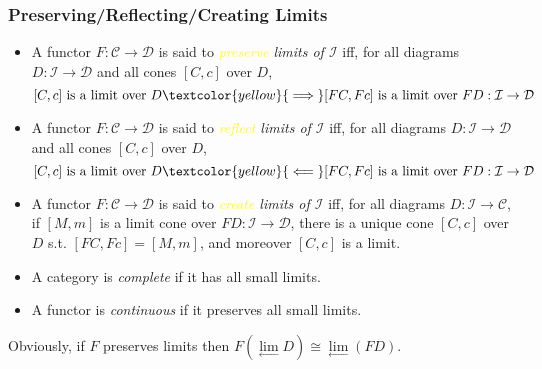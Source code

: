 \documentclass[UTF8,aspectratio=43,11pt,colorlinks,compress,openany]{beamer}%
\begin{document}
\begin{frame}\frametitle{Preserving/Reflecting/Creating Limits}
\begin{itemize}
	\item A functor $F:\mathcal{C}\to\mathcal{D}$ is said to \emph{\textcolor{yellow}{preserve} limits of $\mathcal{I}$} iff, for all diagrams $D:\mathcal{I}\to\mathcal{D}$ and all cones $[C,c]$ over $D$,
	\[[C,c] \mbox{ is a limit over } D\textcolor{yellow}{\implies} [FC,Fc] \mbox{ is a limit over } FD:\mathcal{I}\to\mathcal{D}\]
	\item A functor $F:\mathcal{C}\to\mathcal{D}$ is said to \emph{\textcolor{yellow}{reflect} limits of $\mathcal{I}$} iff, for all diagrams $D:\mathcal{I}\to\mathcal{D}$ and all cones $[C,c]$ over $D$,
	\[[C,c] \mbox{ is a limit over } D\textcolor{yellow}{\impliedby} [FC,Fc] \mbox{ is a limit over } FD:\mathcal{I}\to\mathcal{D}\]
	\item A functor $F:\mathcal{C}\to\mathcal{D}$ is said to \emph{\textcolor{yellow}{create} limits of $\mathcal{I}$} iff, for all diagrams $D:\mathcal{I}\to\mathcal{C}$, if $[M,m]$ is a limit cone over $FD:\mathcal{I}\to\mathcal{D}$, there is a unique cone $[C,c]$ over $D$ s.t. $[FC,Fc]=[M,m]$, and moreover $[C,c]$ is a limit.
	\item A category is \emph{complete} if it has all small limits.
	\item A functor is \emph{continuous} if it preserves all small limits.
\end{itemize}
Obviously, if $F$ preserves limits then $F\left(\lim\limits_\gets D\right)\cong\lim\limits_\gets (FD)$.
\end{frame}
\end{document}
